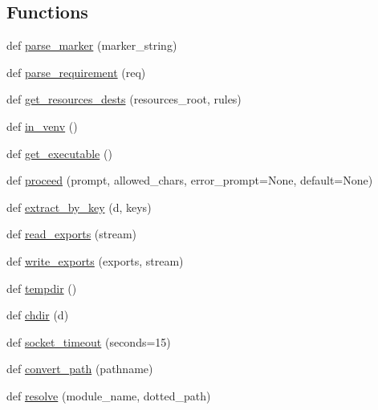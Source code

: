 \subsection*{Functions}
\begin{DoxyCompactItemize}
\item 
def \hyperlink{namespacepip_1_1__vendor_1_1distlib_1_1util_a2d33a11e61e348ae3021d0bc76379089}{parse\+\_\+marker} (marker\+\_\+string)
\item 
def \hyperlink{namespacepip_1_1__vendor_1_1distlib_1_1util_aee45d476a44623cba51ca84e53e1d55c}{parse\+\_\+requirement} (req)
\item 
def \hyperlink{namespacepip_1_1__vendor_1_1distlib_1_1util_a57eb8df7c7bd6576642258d7994af7b0}{get\+\_\+resources\+\_\+dests} (resources\+\_\+root, rules)
\item 
def \hyperlink{namespacepip_1_1__vendor_1_1distlib_1_1util_a5334427aa0e6ab83f4884d1b0051ccfa}{in\+\_\+venv} ()
\item 
def \hyperlink{namespacepip_1_1__vendor_1_1distlib_1_1util_a4a93df6d421029128b2aa97bbced1dbe}{get\+\_\+executable} ()
\item 
def \hyperlink{namespacepip_1_1__vendor_1_1distlib_1_1util_a23f445d41b64c0b629f56eb2469d389a}{proceed} (prompt, allowed\+\_\+chars, error\+\_\+prompt=None, default=None)
\item 
def \hyperlink{namespacepip_1_1__vendor_1_1distlib_1_1util_aa65967e0833118a2cee1f74742b74cea}{extract\+\_\+by\+\_\+key} (d, keys)
\item 
def \hyperlink{namespacepip_1_1__vendor_1_1distlib_1_1util_a24e05fad1ac1d8c59e4dadc3ea24d566}{read\+\_\+exports} (stream)
\item 
def \hyperlink{namespacepip_1_1__vendor_1_1distlib_1_1util_aa639888feb8e7d00083981bd6fe47cd0}{write\+\_\+exports} (exports, stream)
\item 
def \hyperlink{namespacepip_1_1__vendor_1_1distlib_1_1util_ac673f767106dfff08d0c1a4e857e64bc}{tempdir} ()
\item 
def \hyperlink{namespacepip_1_1__vendor_1_1distlib_1_1util_a3e7c4ee14860b0162af512a326ac4005}{chdir} (d)
\item 
def \hyperlink{namespacepip_1_1__vendor_1_1distlib_1_1util_ab42e199acfc500d60b7ab190fdf80ef7}{socket\+\_\+timeout} (seconds=15)
\item 
def \hyperlink{namespacepip_1_1__vendor_1_1distlib_1_1util_a0935a67d848f4420d9c2250f5abfb56b}{convert\+\_\+path} (pathname)
\item 
def \hyperlink{namespacepip_1_1__vendor_1_1distlib_1_1util_a8d3bae50a5197667faaae01660578931}{resolve} (module\+\_\+name, dotted\+\_\+path)

\end{DoxyCompactItemize}
